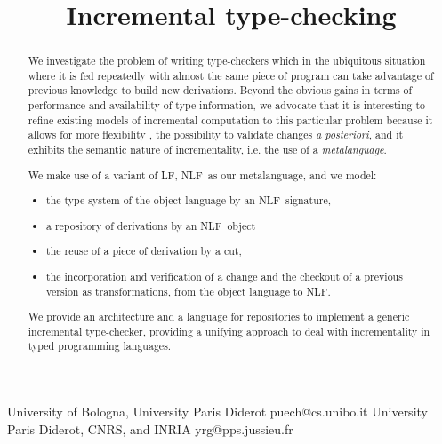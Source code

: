 \documentclass[preprint]{sigplanconf}
\newcommand\lang[1]{\textsf{#1}}
\newcommand\LF{\lang{LF}}
\newcommand\NLF{\lang{NLF}}
\begin{document}
\copyrightdata{[to be supplied]}


\title{Incremental type-checking}

           {University of Bologna, University Paris Diderot}
           {puech@cs.unibo.it}
           {University Paris Diderot, CNRS, and INRIA}
           {yrg@pps.jussieu.fr}

\maketitle

\begin{abstract}
  We investigate the problem of writing type-checkers which in the
  ubiquitous situation where it is fed repeatedly with almost the same
  piece of program can take advantage of previous knowledge to build
  new derivations. Beyond the obvious gains in terms of performance
  and availability of type information, we advocate that it is
  interesting to refine existing models of incremental computation to
  this particular problem because it allows for more flexibility , the
  possibility to validate changes \emph{a posteriori}, and it exhibits
  the semantic nature of incrementality, i.e. the use of a
  \emph{metalanguage}.

  We make use of a variant of \LF, \NLF\ as our metalanguage, and we
  model:
  \begin{itemize}
  \item the type system of the object language by an \NLF\ signature,
  \item a repository of derivations by an \NLF\ object
  \item the reuse of a piece of derivation by a cut,
  \item the incorporation and verification of a change and the
    checkout of a previous version as transformations, from the object
    language to \NLF.
  \end{itemize}

  We provide an architecture and a language for repositories to
  implement a generic incremental type-checker, providing a unifying
  approach to deal with incrementality in typed programming languages.


\end{abstract}
\end{document}
